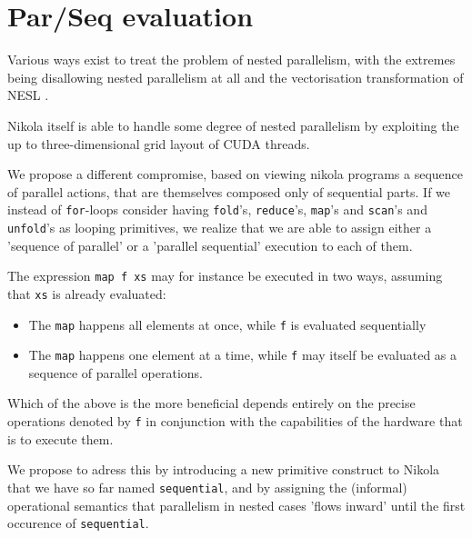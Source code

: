 \chapter{Par/Seq evaluation}


Various ways exist to treat the problem of nested parallelism, with the
extremes being disallowing nested parallelism at all and the vectorisation
transformation of NESL \cite{nesl}.

Nikola itself is able to handle some degree of nested parallelism by exploiting
the up to three-dimensional grid layout of CUDA threads.


We propose a different compromise, based on viewing nikola programs a sequence
of parallel actions, that are themselves composed only of sequential parts.  If we instead of
\texttt{for}-loops consider having \texttt{fold}'s, \texttt{reduce}'s, \texttt{map}'s
and \texttt{scan}'s and \texttt{unfold}'s as looping primitives, we realize that
we are able to assign either a 'sequence of parallel' or a 'parallel sequential'
execution to each of them.


The expression \texttt{map f xs} may for instance be executed in two ways,
assuming that \texttt{xs} is already evaluated:

\begin{itemize}

\item The \texttt{map} happens all elements at once, while \texttt{f} is
evaluated sequentially

\item The \texttt{map} happens one element at a time, while \texttt{f} may itself
be evaluated as a sequence of parallel operations.

\end{itemize}

Which of the above is the more beneficial depends entirely on the precise
operations denoted by \texttt{f} in conjunction with the capabilities of the
hardware that is to execute them.

We propose to adress this by introducing a new primitive construct to Nikola
that we have so far named \texttt{sequential}, and by assigning the (informal)
operational semantics that parallelism in nested cases 'flows inward' until the
first occurence of \texttt{sequential}.

